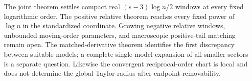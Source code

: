 The joint theorem settles compact real $(s-3)\log n/2$ windows at every
fixed logarithmic order. The positive relative theorem reaches every
fixed power of $\log n$ in the standardized coordinate. Growing negative
relative windows, unbounded moving-order parameters, and macroscopic
positive-tail matching remain open. The matched-derivative theorem
identifies the first discrepancy between suitable models; a complete
single-model expansion of all smaller sectors is a separate question.
Likewise the convergent reciprocal-order chart is local and does not
determine the global Taylor radius after endpoint removability.
